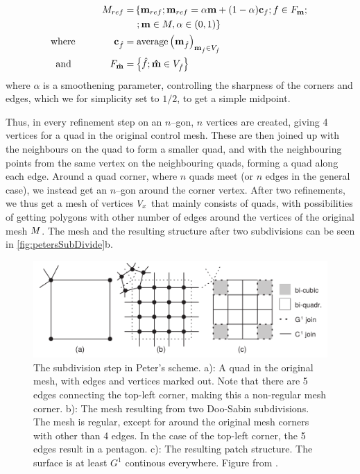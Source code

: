 \begin{align}
\petersControlMeshRef =& \left\lbrace \petersControlMeshVec_{ref} \suchthat\petersControlMeshVec_{ref} = \alpha\petersControlMeshVec + (1-\alpha)\centroidof{f} \suchthat f \in \facesof{\petersControlMeshVec} \suchthat \right.
\\ \notag &
 \left. \suchthat \petersControlMeshVec \in \petersControlMesh, \alpha \in (0,1) \right\rbrace
\\
\where \qquad\qquad \centroidof{\hat{f}} =& \; \text{average}\left(\petersControlMeshVec_{\hat{f}}\right)_{\petersControlMeshVec_{\hat{f}} \in \verticesof{\hat{f}}}
\\
\text{and} \qquad\qquad F_{\vec{\hat{m}}} =& \left\lbrace \hat{f} \suchthat \vec{\hat{m}} \in \verticesof{\hat{f}}	\right\rbrace
\end{align}
where $\alpha$ is a smoothening parameter, controlling the sharpness of the corners and edges, which we for simplicity set to $1/2$, to get a simple midpoint.

Thus, in every refinement step on an $n$--gon, $n$ vertices are created, giving 4 vertices for a quad in the original control mesh. These are then joined up with the neighbours on the quad to form a smaller quad, and with the neighbouring points from the same vertex on the neighbouring quads, forming a quad along each edge. Around a quad corner, where $n$ quads meet (or $n$ edges in the general case), we instead get an $n$--gon around the corner vertex. After two refinements, we thus get a mesh of vertices $\petersPatchPoints$ that mainly consists of quads, with possibilities of getting polygons with other number of edges around the vertices of the original mesh $\petersControlMesh$. The mesh and the resulting structure after two subdivisions can be seen in \autoref{fig:petersSubDivide}b.

\begin{figure}
	\centering
	\includegraphics[width = \textwidth]{Pictures/NURBS/petersQuad_to_patches.png}
	\caption{The subdivision step in Peter's scheme. a): A quad in the original mesh, with edges and vertices marked out. Note that there are 5 edges connecting the top-left corner, making this a non-regular mesh corner. b): The mesh resulting from two Doo-Sabin subdivisions. The mesh is regular, except for around the original mesh corners with other than 4 edges. In the case of the top-left corner, the 5 edges result in a pentagon. c): The resulting \Bez patch structure. The surface is at least $G^1$ continous everywhere. Figure from \cite{eck1996automatic}.}
	\label{fig:petersSubDivide}
\end{figure}

